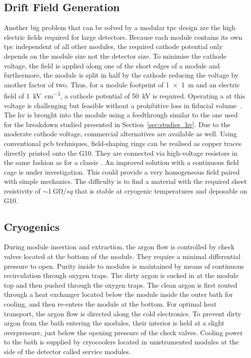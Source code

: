 \subsection{Drift Field Generation}
\label{sec:ac_argoncube_hv}

Another big problem that can be solved by a modular \gls{tpc} design are the high electric fields required for large detectors.
Because each module contains its own \gls{tpc} independent of all other modules, the required cathode potential only depends on the module size not the detector size.
To minimise the cathode voltage, the field is applied along one of the short edges of a module and furthermore, the module is split in half by the cathode reducing the voltage by another factor of two.
Thus, for a module footprint of \SI{1 x 1}{\metre} and an electric field of \SI{1}{\kilo\volt\per\centi\metre}, a cathode potential of \SI{50}{\kilo\volt} is required.
Operating a \lartpc{} at this voltage is challenging but feasible without a prohibitive loss in fiducial volume~\cite{AT}.
The \gls{hv} is brought into the module using a feedthrough similar to the one used for the breakdown studied presented in Section~\ref{sec:studies_hv}.
Due to the moderate cathode voltage, commercial alternatives are available as well.
Using conventional \gls{pcb} techniques, field-shaping rings can be realised as copper traces directly printed onto the G10.
They are connected via high-voltage resistors in the same fashion as for a classic \lartpc{}.
An improved solution with a continuous field cage is under investigation.
This could provide a very homogeneous field paired with simple mechanics.
The difficulty is to find a material with the required sheet resistivity of $\sim{\SI{1}{\giga\ohm\per sq}}$ that is stable at cryogenic temperatures and deposable on G10.


\subsection{Cryogenics}
\label{sec:ac_argoncube_cryo}

During module insertion and extraction, the argon flow is controlled by check valves located at the bottom of the module.
They require a minimal differential pressure to open.
Purity inside to modules is maintained by means of continuous \lar{} recirculation through oxygen traps.
The dirty argon is sucked in at the module top and then pushed through the oxygen traps.
The clean argon is first routed through a heat exchanger located below the module inside the outer bath for cooling, and then re-enters the module at the bottom.
For optimal heat transport, the argon flow is directed along the cold electronics.
To prevent dirty argon from the bath entering the modules, their interior is held at a slight overpressure, just below the opening pressure of the check valves.
Cooling power to the bath is supplied by cryocoolers located in unistrumented modules at the side of the detector called service modules.

